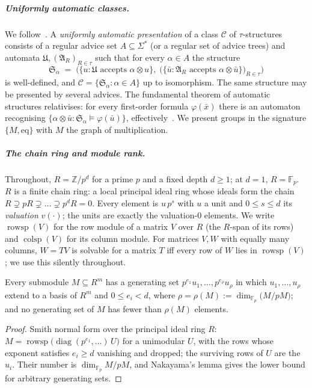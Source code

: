 \documentclass[a4paper,UKenglish,autoref,anonymous]{lipics-v2021}
\newcommand{\Fp}{\mathbb{F}_p}
\newcommand{\ZZ}{\mathbb{Z}}
\newcommand{\R}{R}                                   %
\newcommand{\rs}{\operatorname{rowsp}}
\newcommand{\cs}{\operatorname{colsp}}
\newcommand{\mrk}{\rho}                              %
\newcommand{\adv}{\alpha}
\newcommand{\conv}{\otimes}
\begin{document}
\subparagraph*{Uniformly automatic classes.}
We follow~\cite{AbuZaidGraedelReinhardt2017}. A \emph{uniformly automatic
presentation} of a class $\mathcal{C}$ of $\tau$-structures consists of a
regular advice set $A \subseteq \Sigma^*$ (or a regular set of advice trees)
and automata $\mathfrak{U}, (\mathfrak{A}_R)_{R \in \tau}$ such that for
every $\adv \in A$ the structure
\[
  \mathfrak{S}_\adv \;=\; \bigl( \{ u : \mathfrak{U} \text{ accepts } \adv
  \conv u \},\; \bigl( \{ \bar u : \mathfrak{A}_R \text{ accepts } \adv \conv
  \bar u \} \bigr)_{R \in \tau} \bigr)
\]
is well-defined, and $\mathcal{C} = \{ \mathfrak{S}_\adv : \adv \in A \}$ up
to isomorphism. The same structure may be presented by several advices. The
fundamental theorem of automatic structures relativises: for every
first-order formula $\varphi(\bar x)$ there is an automaton recognising
$\{ \adv \conv \bar u : \mathfrak{S}_\adv \models \varphi(\bar u) \}$,
effectively~\cite{AbuZaidGraedelReinhardt2017}. We present groups in the
signature $\{M, \mathrm{eq}\}$ with $M$ the graph of multiplication.

\subparagraph*{The chain ring and module rank.}
Throughout, $\R = \ZZ/p^d$ for a prime $p$ and a fixed depth $d \ge 1$; at
$d = 1$, $\R = \Fp$. $\R$ is a finite chain ring: a local principal ideal
ring whose ideals form the chain $\R \supsetneq p\R \supsetneq \dots
\supsetneq p^d\R = 0$. Every element is $u\,p^s$ with $u$ a unit and $0
\le s \le d$ its \emph{valuation} $v(\cdot)$; the units are exactly the
valuation-$0$ elements. We write $\rs(V)$ for the row module of a matrix
$V$ over $\R$ (the $\R$-span of its rows) and $\cs(V)$ for its column
module. For matrices $V, W$ with equally many columns, $W = TV$ is
solvable for a matrix $T$ iff every row of $W$ lies in $\rs(V)$; we use
this silently throughout.

\begin{lemma}
\label{lem:smith}
Every submodule $M \subseteq \R^{m}$ has a generating set
$p^{e_1}u_1, \dots, p^{e_\mrk} u_\mrk$ in which $u_1, \dots, u_\mrk$
extend to a basis of $\R^m$ and $0 \le e_i < d$, where
$\mrk = \mrk(M) := \dim_{\Fp}\bigl(M/pM\bigr)$; and no generating set of
$M$ has fewer than $\mrk(M)$ elements.
\end{lemma}

\begin{proof}
Smith normal form over the principal ideal ring $\R$: $M =
\rs\bigl(\operatorname{diag}(p^{e_1}, \dots)\,U\bigr)$ for a unimodular
$U$, with the rows whose exponent satisfies $e_i \ge d$ vanishing and
dropped; the surviving rows of $U$ are the $u_i$. Their number is
$\dim_{\Fp} M/pM$, and Nakayama's lemma gives the lower bound for
arbitrary generating sets.
\end{proof}
\end{document}

